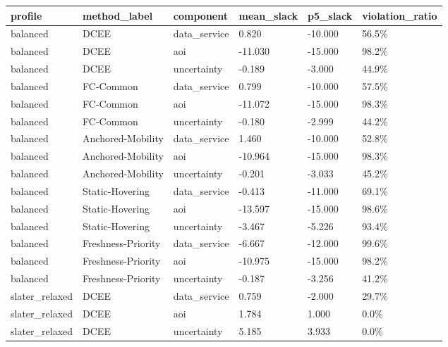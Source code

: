 \begin{tabular}{llllll}
\toprule
profile & method_label & component & mean_slack & p5_slack & violation_ratio \\
\midrule
balanced & DCEE & data_service & 0.820 & -10.000 & 56.5\% \\
balanced & DCEE & aoi & -11.030 & -15.000 & 98.2\% \\
balanced & DCEE & uncertainty & -0.189 & -3.000 & 44.9\% \\
balanced & FC-Common & data_service & 0.799 & -10.000 & 57.5\% \\
balanced & FC-Common & aoi & -11.072 & -15.000 & 98.3\% \\
balanced & FC-Common & uncertainty & -0.180 & -2.999 & 44.2\% \\
balanced & Anchored-Mobility & data_service & 1.460 & -10.000 & 52.8\% \\
balanced & Anchored-Mobility & aoi & -10.964 & -15.000 & 98.3\% \\
balanced & Anchored-Mobility & uncertainty & -0.201 & -3.033 & 45.2\% \\
balanced & Static-Hovering & data_service & -0.413 & -11.000 & 69.1\% \\
balanced & Static-Hovering & aoi & -13.597 & -15.000 & 98.6\% \\
balanced & Static-Hovering & uncertainty & -3.467 & -5.226 & 93.4\% \\
balanced & Freshness-Priority & data_service & -6.667 & -12.000 & 99.6\% \\
balanced & Freshness-Priority & aoi & -10.975 & -15.000 & 98.2\% \\
balanced & Freshness-Priority & uncertainty & -0.187 & -3.256 & 41.2\% \\
slater_relaxed & DCEE & data_service & 0.759 & -2.000 & 29.7\% \\
slater_relaxed & DCEE & aoi & 1.784 & 1.000 & 0.0\% \\
slater_relaxed & DCEE & uncertainty & 5.185 & 3.933 & 0.0\% \\
\bottomrule
\end{tabular}
